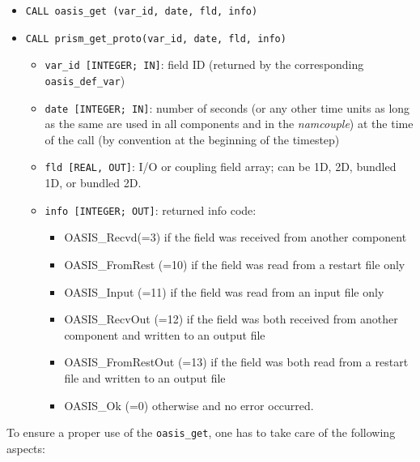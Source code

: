 \begin{itemize}
 
\item {\tt CALL oasis\_get (var\_id, date, fld, info)}
\item {\tt CALL prism\_get\_proto(var\_id, date, fld, info)}
  \begin{itemize}
  \item {\tt var\_id [INTEGER; IN]}: field ID (returned by the corresponding
    {\tt oasis\_def\_var})
  \item {\tt date [INTEGER; IN]}: number of seconds (or any other time
    units as long as the same are used in all components and in the {\it
      namcouple}) at the time of the call (by convention at the
    beginning of the timestep)
  \item {\tt fld [REAL, OUT]}: I/O or coupling field array;  
    can be 1D, 2D, bundled 1D, or bundled 2D.
  \item {\tt info [INTEGER; OUT]}: returned info code:
    \begin{itemize}
    \item OASIS\_Recvd(=3) if the field was received from another
      component
    \item OASIS\_FromRest (=10) if the field was read from a restart
      file only
    \item OASIS\_Input (=11) if the field was read from an input file
      only
    \item OASIS\_RecvOut (=12) if the field was both received from
      another component and written to an output file
    \item OASIS\_FromRestOut (=13) if the field was both read from a
      restart file and written to an output file
    \item OASIS\_Ok (=0) otherwise and no error occurred.
    \end{itemize}
  \end{itemize}
\end{itemize}

To ensure a proper use of the {\tt oasis\_get}, one has to take care of the following aspects:

